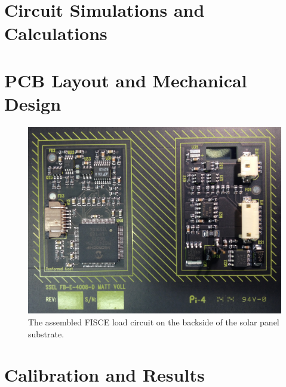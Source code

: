 \section{Circuit Simulations and Calculations}\label{Sect:fisce_calc}



\section{PCB Layout and Mechanical Design}\label{Sect:fisce_pcb}

\begin{figure}[htbp]
	\centering
	\includegraphics[width=\textwidth]{../figs/fisce/manufacturing/fisce_assembled.jpg}
	\caption{The assembled FISCE load circuit on the backside of the solar panel substrate.}
	\label{fig:fisce_assembled}
\end{figure}

\section{Calibration and Results}\label{Sect:fisce_results}
